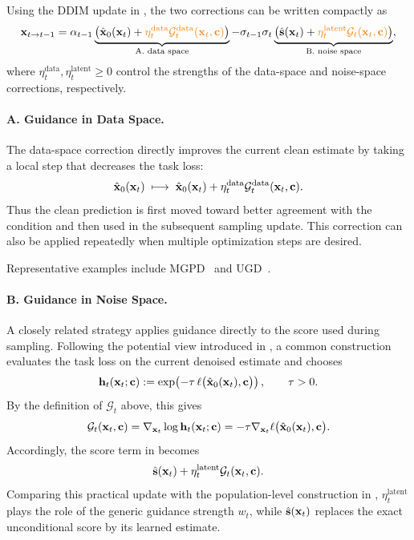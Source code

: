 Using the DDIM update in , the two
corrections can be written compactly as
\begin{align}\label{eq:ddim-update-clean-noise-guide}
\begin{aligned}
{\mathbf{x}}_{t\rightarrow t-1}
=
\alpha_{t-1}
\underbrace{\left(
\hat{{\mathbf{x}}}_0({\mathbf{x}}_t)
+
{\color{orange}
\eta_t^{\text{data}}
\mathcal G_t^{\text{data}}({\mathbf{x}}_t,{\mathbf{c}})}
\right)}_{\text{A. data space}}
-
\sigma_{t-1}\sigma_t
\underbrace{\left(
\hat{{\mathbf{s}}}({\mathbf{x}}_t)
+
{\color{orange}
\eta_t^{\text{latent}}
\mathcal G_t({\mathbf{x}}_t,{\mathbf{c}})}
\right)}_{\text{B. noise space}},
\end{aligned}
\end{align}
where
$\eta_t^{\text{data}},\eta_t^{\text{latent}}\geq0$
control the strengths of the data-space and noise-space corrections,
respectively.


\paragraph{A. Guidance in Data Space.}
The data-space correction directly improves the current clean estimate by
taking a local step that decreases the task loss:
\[
\hat{{\mathbf{x}}}_0({\mathbf{x}}_t)
\;\longmapsto\;
\hat{{\mathbf{x}}}_0({\mathbf{x}}_t)
+
\eta_t^{\text{data}}
\mathcal G_t^{\text{data}}({\mathbf{x}}_t,{\mathbf{c}}).
\]
Thus the clean prediction is first moved toward better agreement with the
condition and then used in the subsequent sampling update. This correction
can also be applied repeatedly when multiple optimization steps are desired.

Representative examples include MGPD~\citep{he2023manifold} and
UGD~\citep{bansal2023universal}.


\paragraph{B. Guidance in Noise Space.}
A closely related strategy applies guidance directly to the score used during
sampling. Following the potential view introduced in
, a common construction evaluates the task loss on
the current denoised estimate and chooses
\[
{\mathbf{h}}_t({\mathbf{x}}_t;{\mathbf{c}})
:=
\exp\!\left(
-\tau\,\ell\bigl(\hat{{\mathbf{x}}}_0({\mathbf{x}}_t),{\mathbf{c}}\bigr)
\right),
\qquad \tau>0.
\]
By the definition of $\mathcal G_t$ above, this gives
\begin{align*}
\mathcal G_t({\mathbf{x}}_t,{\mathbf{c}})
=
\nabla_{{\mathbf{x}}_t}\log{\mathbf{h}}_t({\mathbf{x}}_t;{\mathbf{c}})
=
-\tau
\nabla_{{\mathbf{x}}_t}
\ell\bigl(\hat{{\mathbf{x}}}_0({\mathbf{x}}_t),{\mathbf{c}}\bigr).
\end{align*}
Accordingly, the score term in
 becomes
\[
\hat{{\mathbf{s}}}({\mathbf{x}}_t)
+
\eta_t^{\text{latent}}
\mathcal G_t({\mathbf{x}}_t,{\mathbf{c}}).
\]
Comparing this practical update with the population-level construction in
,
$\eta_t^{\text{latent}}$ plays the role of the generic guidance strength
$w_t$, while $\hat{{\mathbf{s}}}({\mathbf{x}}_t)$ replaces the exact unconditional score by
its learned estimate.

